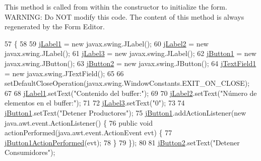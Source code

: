 This method is called from within the constructor to initialize the form. W\+A\+R\+N\+I\+NG\+: Do N\+OT modify this code. The content of this method is always regenerated by the Form Editor. 
\begin{DoxyCode}
57                                   \{
58 
59         \mbox{\hyperlink{class_ejercicio2_1_1_buffer_interfaz_adc7aca7314d0fe3c8cbe793a812d21b2}{jLabel1}} = \textcolor{keyword}{new} javax.swing.JLabel();
60         \mbox{\hyperlink{class_ejercicio2_1_1_buffer_interfaz_ac8adb3eda942e75c690374fafc43eee2}{jLabel2}} = \textcolor{keyword}{new} javax.swing.JLabel();
61         \mbox{\hyperlink{class_ejercicio2_1_1_buffer_interfaz_ab11594779db262d4fc72c8c1515b7fd9}{jLabel3}} = \textcolor{keyword}{new} javax.swing.JLabel();
62         \mbox{\hyperlink{class_ejercicio2_1_1_buffer_interfaz_a1ec51a96e127bf42cda327fbfeb2a518}{jButton1}} = \textcolor{keyword}{new} javax.swing.JButton();
63         \mbox{\hyperlink{class_ejercicio2_1_1_buffer_interfaz_a0c2d3a8ae39447836ea6faf16fb98ec3}{jButton2}} = \textcolor{keyword}{new} javax.swing.JButton();
64         \mbox{\hyperlink{class_ejercicio2_1_1_buffer_interfaz_a2cfe0e22bb31e597087955036f69b34a}{jTextField1}} = \textcolor{keyword}{new} javax.swing.JTextField();
65 
66         setDefaultCloseOperation(javax.swing.WindowConstants.EXIT\_ON\_CLOSE);
67 
68         \mbox{\hyperlink{class_ejercicio2_1_1_buffer_interfaz_adc7aca7314d0fe3c8cbe793a812d21b2}{jLabel1}}.setText(\textcolor{stringliteral}{"Contenido del buffer:"});
69 
70         \mbox{\hyperlink{class_ejercicio2_1_1_buffer_interfaz_ac8adb3eda942e75c690374fafc43eee2}{jLabel2}}.setText(\textcolor{stringliteral}{"Número de elementos en el buffer:"});
71 
72         \mbox{\hyperlink{class_ejercicio2_1_1_buffer_interfaz_ab11594779db262d4fc72c8c1515b7fd9}{jLabel3}}.setText(\textcolor{stringliteral}{"0"});
73 
74         \mbox{\hyperlink{class_ejercicio2_1_1_buffer_interfaz_a1ec51a96e127bf42cda327fbfeb2a518}{jButton1}}.setText(\textcolor{stringliteral}{"Detener Productores"});
75         \mbox{\hyperlink{class_ejercicio2_1_1_buffer_interfaz_a1ec51a96e127bf42cda327fbfeb2a518}{jButton1}}.addActionListener(\textcolor{keyword}{new} java.awt.event.ActionListener() \{
76             \textcolor{keyword}{public} \textcolor{keywordtype}{void} actionPerformed(java.awt.event.ActionEvent evt) \{
77                 \mbox{\hyperlink{class_ejercicio2_1_1_buffer_interfaz_a79e9c5884d7a271f4ea91c1807f846da}{jButton1ActionPerformed}}(evt);
78             \}
79         \});
80 
81         \mbox{\hyperlink{class_ejercicio2_1_1_buffer_interfaz_a0c2d3a8ae39447836ea6faf16fb98ec3}{jButton2}}.setText(\textcolor{stringliteral}{"Detener Consumidores"});

\end{DoxyCode}
